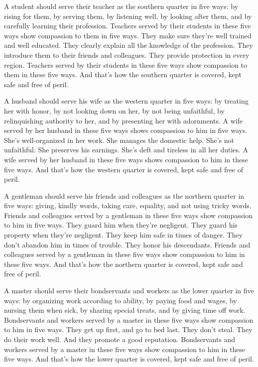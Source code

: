 \documentclass[12pt,openany]{book}%
\begin{document}
A student should serve their teacher as the southern quarter in five ways: by rising for them, by serving them, by listening well, by looking after them, and by carefully learning their profession. Teachers served by their students in these five ways show compassion to them in five ways. They make sure they’re well trained and well educated. They clearly explain all the knowledge of the profession. They introduce them to their friends and colleagues. They provide protection in every region. Teachers served by their students in these five ways show compassion to them in these five ways. And that’s how the southern quarter is covered, kept safe and free of peril. 

A husband should serve his wife as the western quarter in five ways: by treating her with honor, by not looking down on her, by not being unfaithful, by relinquishing authority to her, and by presenting her with adornments. A wife served by her husband in these five ways shows compassion to him in five ways. She’s well-organized in her work. She manages the domestic help. She’s not unfaithful. She preserves his earnings. She’s deft and tireless in all her duties. A wife served by her husband in these five ways shows compassion to him in these five ways. And that’s how the western quarter is covered, kept safe and free of peril. 

A gentleman should serve his friends and colleagues as the northern quarter in five ways: giving, kindly words, taking care, equality, and not using tricky words. Friends and colleagues served by a gentleman in these five ways show compassion to him in five ways. They guard him when they’re negligent. They guard his property when they’re negligent. They keep him safe in times of danger. They don’t abandon him in times of trouble. They honor his descendants. Friends and colleagues served by a gentleman in these five ways show compassion to him in these five ways. And that’s how the northern quarter is covered, kept safe and free of peril. 

A master should serve their bondservants and workers as the lower quarter in five ways: by organizing work according to ability, by paying food and wages, by nursing them when sick, by sharing special treats, and by giving time off work. Bondservants and workers served by a master in these five ways show compassion to him in five ways. They get up first, and go to bed last. They don’t steal. They do their work well. And they promote a good reputation. Bondservants and workers served by a master in these five ways show compassion to him in these five ways. And that’s how the lower quarter is covered, kept safe and free of peril. 
\end{document}

